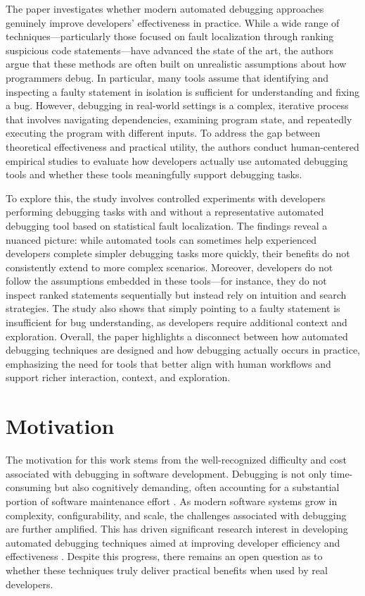 The paper investigates whether modern automated debugging approaches genuinely improve developers’ effectiveness in practice. While a wide range of techniques—particularly those focused on fault localization through ranking suspicious code statements—have advanced the state of the art, the authors argue that these methods are often built on unrealistic assumptions about how programmers debug. In particular, many tools assume that identifying and inspecting a faulty statement in isolation is sufficient for understanding and fixing a bug. However, debugging in real-world settings is a complex, iterative process that involves navigating dependencies, examining program state, and repeatedly executing the program with different inputs. To address the gap between theoretical effectiveness and practical utility, the authors conduct human-centered empirical studies to evaluate how developers actually use automated debugging tools and whether these tools meaningfully support debugging tasks.

To explore this, the study involves controlled experiments with developers performing debugging tasks with and without a representative automated debugging tool based on statistical fault localization. The findings reveal a nuanced picture: while automated tools can sometimes help experienced developers complete simpler debugging tasks more quickly, their benefits do not consistently extend to more complex scenarios. Moreover, developers do not follow the assumptions embedded in these tools—for instance, they do not inspect ranked statements sequentially but instead rely on intuition and search strategies. The study also shows that simply pointing to a faulty statement is insufficient for bug understanding, as developers require additional context and exploration. Overall, the paper highlights a disconnect between how automated debugging techniques are designed and how debugging actually occurs in practice, emphasizing the need for tools that better align with human workflows and support richer interaction, context, and exploration.

\section{Motivation}
The motivation for this work stems from the well-recognized difficulty and cost associated with debugging in software development. Debugging is not only time-consuming but also cognitively demanding, often accounting for a substantial portion of software maintenance effort \cite{Vessey1985}. As modern software systems grow in complexity, configurability, and scale, the challenges associated with debugging are further amplified. This has driven significant research interest in developing automated debugging techniques aimed at improving developer efficiency and effectiveness \cite{Zeller2002,Ball2003,Liblit2005}. Despite this progress, there remains an open question as to whether these techniques truly deliver practical benefits when used by real developers.

